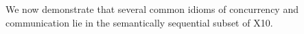 We now demonstrate that several common idioms of concurrency and
communication lie in the semantically sequential subset of X10.

